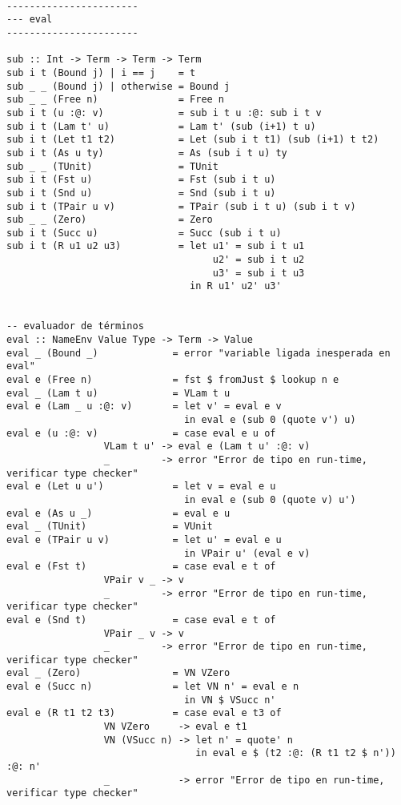 \documentclass[a4paper]{article}
\begin{document}
\begin{lstlisting}

-----------------------
--- eval
-----------------------

sub :: Int -> Term -> Term -> Term
sub i t (Bound j) | i == j    = t
sub _ _ (Bound j) | otherwise = Bound j
sub _ _ (Free n)              = Free n
sub i t (u :@: v)             = sub i t u :@: sub i t v
sub i t (Lam t' u)            = Lam t' (sub (i+1) t u)
sub i t (Let t1 t2)           = Let (sub i t t1) (sub (i+1) t t2)
sub i t (As u ty)             = As (sub i t u) ty
sub _ _ (TUnit)               = TUnit
sub i t (Fst u)               = Fst (sub i t u)
sub i t (Snd u)               = Snd (sub i t u)
sub i t (TPair u v)           = TPair (sub i t u) (sub i t v)
sub _ _ (Zero)                = Zero
sub i t (Succ u)              = Succ (sub i t u)
sub i t (R u1 u2 u3)          = let u1' = sub i t u1
                                    u2' = sub i t u2
                                    u3' = sub i t u3
                                in R u1' u2' u3'


-- evaluador de términos
eval :: NameEnv Value Type -> Term -> Value
eval _ (Bound _)             = error "variable ligada inesperada en eval"
eval e (Free n)              = fst $ fromJust $ lookup n e
eval _ (Lam t u)             = VLam t u
eval e (Lam _ u :@: v)       = let v' = eval e v
                               in eval e (sub 0 (quote v') u)
eval e (u :@: v)             = case eval e u of
                 VLam t u' -> eval e (Lam t u' :@: v)
                 _         -> error "Error de tipo en run-time, verificar type checker"
eval e (Let u u')            = let v = eval e u
                               in eval e (sub 0 (quote v) u')
eval e (As u _)              = eval e u
eval _ (TUnit)               = VUnit
eval e (TPair u v)           = let u' = eval e u
                               in VPair u' (eval e v)
eval e (Fst t)               = case eval e t of
                 VPair v _ -> v
                 _         -> error "Error de tipo en run-time, verificar type checker"
eval e (Snd t)               = case eval e t of
                 VPair _ v -> v
                 _         -> error "Error de tipo en run-time, verificar type checker"
eval _ (Zero)                = VN VZero
eval e (Succ n)              = let VN n' = eval e n
                               in VN $ VSucc n'
eval e (R t1 t2 t3)          = case eval e t3 of
                 VN VZero     -> eval e t1
                 VN (VSucc n) -> let n' = quote' n
                                 in eval e $ (t2 :@: (R t1 t2 $ n')) :@: n'
                 _            -> error "Error de tipo en run-time, verificar type checker"


\end{lstlisting}
\end{document}
